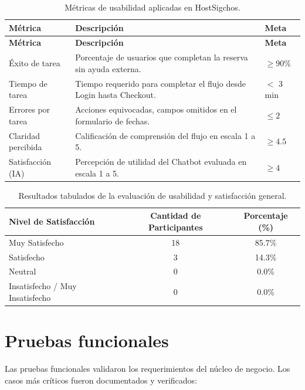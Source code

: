 \documentclass[12pt,letterpaper]{report}
\begin{document}
\begin{longtable}{p{4cm}p{8.5cm}p{2cm}}
\caption{Métricas de usabilidad aplicadas en HostSigchos.}\\
\toprule
\textbf{Métrica} & \textbf{Descripción} & \textbf{Meta}\\
\midrule
\endfirsthead
\toprule
\textbf{Métrica} & \textbf{Descripción} & \textbf{Meta}\\
\midrule
\endhead
Éxito de tarea & Porcentaje de usuarios que completan la reserva sin ayuda externa. & $\geq 90\%$\\
Tiempo de tarea & Tiempo requerido para completar el flujo desde Login hasta Checkout. & $<$ 3 min\\
Errores por tarea & Acciones equivocadas, campos omitidos en el formulario de fechas. & $\leq 2$\\
Claridad percibida & Calificación de comprensión del flujo en escala 1 a 5. & $\geq 4.5$\\
Satisfacción (IA) & Percepción de utilidad del Chatbot evaluada en escala 1 a 5. & $\geq 4$\\
\bottomrule
\end{longtable}

\begin{table}[H]
  \centering
  \caption{Resultados tabulados de la evaluación de usabilidad y satisfacción general.}
  \begin{tabular}{l c c}
    \toprule
    \textbf{Nivel de Satisfacción} & \textbf{Cantidad de Participantes} & \textbf{Porcentaje (\%)} \\
    \midrule
    Muy Satisfecho & 18 & 85.7\% \\
    Satisfecho & 3 & 14.3\% \\
    Neutral & 0 & 0.0\% \\
    Insatisfecho / Muy Insatisfecho & 0 & 0.0\% \\
    \bottomrule
  \end{tabular}
\end{table}

\section{Pruebas funcionales}
Las pruebas funcionales validaron los requerimientos del núcleo de negocio. Los casos más críticos fueron documentados y verificados:
\end{document}

